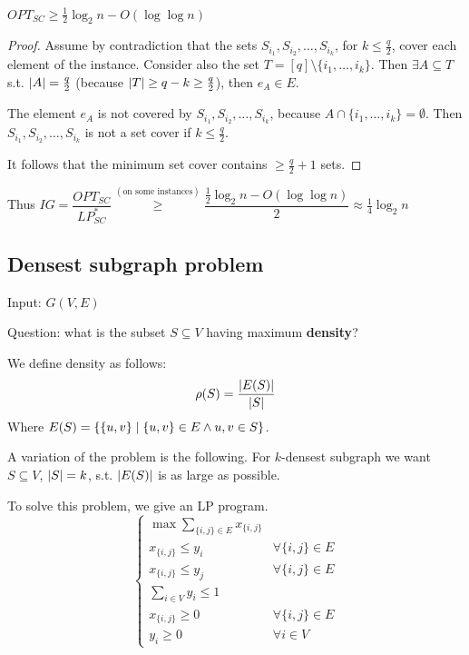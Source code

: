     \begin{lemma}
        $OPT_{SC} \geq \frac{1}{2} \log_2 n - O(\log \log n)$
    \end{lemma}

    \begin{proof}
        Assume by contradiction that the sets $S_{i_1}, S_{i_2}, \dots, S_{i_k}$, for $k \leq \frac{q}{2}$, cover each element of the instance.
        Consider also the set $T = [q] \setminus \{ i_1, \dots, i_k \}$.
        Then $\exists A \subseteq T$ s.t. $\vert A \vert = \frac{q}{2}$ (because $\vert T \vert \geq q - k \geq \frac{q}{2}$), then $e_A \in E$.

        The element $e_A$ is not covered by $S_{i_1}, S_{i_2}, \dots, S_{i_k}$, because $A \cap \{ i_1, \dots, i_k \} = \emptyset$.
        Then $S_{i_1}, S_{i_2}, \dots, S_{i_k}$ is not a set cover if $k \leq \frac{q}{2}$.

        It follows that the minimum set cover contains $\geq \frac{q}{2} + 1$ sets.
    \end{proof}

    Thus $IG = \dfrac{OPT_{SC}}{LP_{SC}^*} \overset{(\text{on some instances})}{\geq} \dfrac{\frac{1}{2} \log_2 n - O(\log \log n)}{2} \approx \frac{1}{4} \log_2 n$


\subsection{Densest subgraph problem}\label{subsec:densestsubgraph_problem}

    Input: $G(V,E)$

    Question: what is the subset $S \subseteq V$ having maximum \textbf{density}?

    We define density as follows:
    \[ \rho(S) = \dfrac{\vert E(S) \vert}{\vert S \vert} \]
    Where $E(S) = \{ \{u,v\} \; \vert \; \{u,v\} \in E \wedge u,v \in S \}$.

    A variation of the problem is the following.
    For $k$-densest subgraph we want $S \subseteq V$, $\vert S \vert = k$, s.t. $\vert E(S) \vert$ is as large as possible.

    To solve this problem, we give an LP program.
    \begin{equation}\label{eq:densestsubgraph_lp}
        \begin{cases}
            \max \sum_{\{i,j\} \in E} x_{\{i,j\}}                           \\
            x_{\{i,j\}} \leq y_i                    & \forall \{i,j\} \in E \\
            x_{\{i,j\}} \leq y_j                    & \forall \{i,j\} \in E \\
            \sum_{i \in V} y_i \leq 1                                       \\
            x_{\{i,j\}} \geq 0                      & \forall \{i,j\} \in E \\
            y_i \geq 0                              & \forall i \in V
        \end{cases}
    \end{equation}

